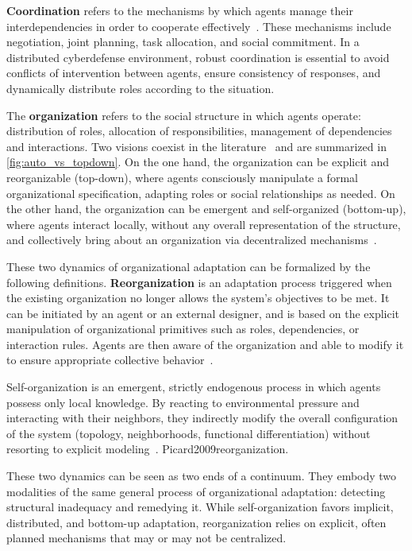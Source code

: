 \textbf{Coordination} refers to the mechanisms by which agents manage their interdependencies in order to cooperate effectively~\cite{Durfee2001, Jennings1996, Sandholm1999}. These mechanisms include negotiation, joint planning, task allocation, and social commitment. In a distributed cyberdefense environment, robust coordination is essential to avoid conflicts of intervention between agents, ensure consistency of responses, and dynamically distribute roles according to the situation.

The \textbf{organization} refers to the social structure in which agents operate: distribution of roles, allocation of responsibilities, management of dependencies and interactions. Two visions coexist in the literature~\cite{Picard2009reorganisation} and are summarized in \autoref{fig:auto_vs_topdown}. On the one hand, the organization can be explicit and reorganizable (top-down), where agents consciously manipulate a formal organizational specification, adapting roles or social relationships as needed. On the other hand, the organization can be emergent and self-organized (bottom-up), where agents interact locally, without any overall representation of the structure, and collectively bring about an organization via decentralized mechanisms~\cite{Heylighen1999, DiMarzoSerugendo2006}.

These two dynamics of organizational adaptation can be formalized by the following definitions. \textbf{Reorganization} is an adaptation process triggered when the existing organization no longer allows the system's objectives to be met. It can be initiated by an agent or an external designer, and is based on the explicit manipulation of organizational primitives such as roles, dependencies, or interaction rules. Agents are then aware of the organization and able to modify it to ensure appropriate collective behavior~\cite{Picard2009reorganisation}.

Self-organization is an emergent, strictly endogenous process in which agents possess only local knowledge. By reacting to environmental pressure and interacting with their neighbors, they indirectly modify the overall configuration of the system (topology, neighborhoods, functional differentiation) without resorting to explicit modeling~\cite{Picard2009reorganisation}. {Picard2009reorganization}.

These two dynamics can be seen as two ends of a continuum. They embody two modalities of the same general process of organizational adaptation: detecting structural inadequacy and remedying it. While self-organization favors implicit, distributed, and bottom-up adaptation, reorganization relies on explicit, often planned mechanisms that may or may not be centralized.

